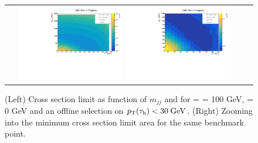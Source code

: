 \begin{figure}[tbh!]
	\centering
	\begin{tabular}{cc}
		\includegraphics[width=0.45\textwidth]{analysis/pics/JetInvMass_vs_MET_xsec_chi100_lsp000_taupt30.pdf}
		\includegraphics[width=0.45\textwidth]{analysis/pics/JetInvMass_vs_MET_xsec_chi100_lsp000_taupt30_zoom.pdf} 		
	\end{tabular}
	\caption{(Left) Cross section limit as function of $m_{jj}$ and \met for \charginopm = \neutralinotwo = 100 GeV, \neutralinoone = 0 GeV and an offline selection on $p_{\text{T}}(\tau_{\text{h}}) <  30\;\text{Ge}\kern-0.06667em\text{V}$. (Right) Zooming into the minimum cross section limit area for the same benchmark point.}
	\label{fig::JetInvMass_vs_MET_xsec_chi100_lsp000_taupt30}
\end{figure}

